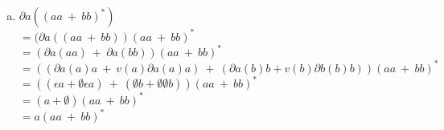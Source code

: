 \documentclass{article}
\begin{document}
\begin{enumerate}
{\begin{enumerate}[a)]
{		}
		
		\item{
		$\partial{a} ((aa \  + \  bb)^*)$\\
		$= (\partial{a} ((aa \  + \  bb))(aa \ + \ bb)^*$\\
		$= (\partial{a} (aa) \  + \  \partial{a} (bb))(aa \ + \ bb)^*$\\
		$= ((\partial{a} (a)a \ + \ v(a)\partial{a} (a)a) \  + \  (
		\partial{a} (b)b + v(b)\partial{b}(b) b))(aa \ + \ bb)^*$\\
		$= ((\epsilon a + \emptyset \epsilon a) \  + \  (\emptyset b + \emptyset\emptyset b))(aa \ + \ bb)^*$\\
		$= (a + \emptyset)(aa \ + \ bb)^*$\\
		$= a(aa \ + \ bb)^*$
			
		}		
		
		\end{enumerate}		        
        
        
        }
    \end{enumerate}
\end{document}
